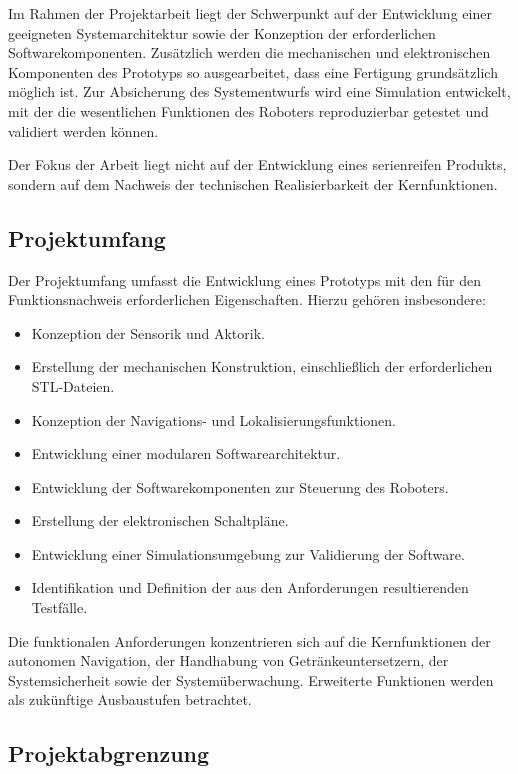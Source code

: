 \documentclass[
  a4paper,
  12pt,
  DIV=12,        %
  parskip=half,  %
  headings=small %
]{scrartcl}
\theoremstyle{definition}
\providecommand{\tightlist}{%
  \setlength{\itemsep}{0pt}\setlength{\parskip}{0pt}}
\theoremstyle{definition}
\begin{document}
Im Rahmen der Projektarbeit liegt der Schwerpunkt auf der Entwicklung
einer geeigneten Systemarchitektur sowie der Konzeption der
erforderlichen Softwarekomponenten. Zusätzlich werden die mechanischen
und elektronischen Komponenten des Prototyps so ausgearbeitet, dass eine
Fertigung grundsätzlich möglich ist. Zur Absicherung des Systementwurfs
wird eine Simulation entwickelt, mit der die wesentlichen Funktionen des
Roboters reproduzierbar getestet und validiert werden können.

Der Fokus der Arbeit liegt nicht auf der Entwicklung eines serienreifen
Produkts, sondern auf dem Nachweis der technischen Realisierbarkeit der
Kernfunktionen.

\subsection{Projektumfang}\label{projektumfang}

Der Projektumfang umfasst die Entwicklung eines Prototyps mit den für
den Funktionsnachweis erforderlichen Eigenschaften. Hierzu gehören
insbesondere:

\begin{itemize}
\tightlist
\item
  Konzeption der Sensorik und Aktorik.
\item
  Erstellung der mechanischen Konstruktion, einschließlich der
  erforderlichen STL-Dateien.
\item
  Konzeption der Navigations- und Lokalisierungsfunktionen.
\item
  Entwicklung einer modularen Softwarearchitektur.
\item
  Entwicklung der Softwarekomponenten zur Steuerung des Roboters.
\item
  Erstellung der elektronischen Schaltpläne.
\item
  Entwicklung einer Simulationsumgebung zur Validierung der Software.
\item
  Identifikation und Definition der aus den Anforderungen resultierenden
  Testfälle.
\end{itemize}

Die funktionalen Anforderungen konzentrieren sich auf die Kernfunktionen
der autonomen Navigation, der Handhabung von Getränkeuntersetzern, der
Systemsicherheit sowie der Systemüberwachung. Erweiterte Funktionen
werden als zukünftige Ausbaustufen betrachtet.

\subsection{Projektabgrenzung}\label{projektabgrenzung}
\end{document}
